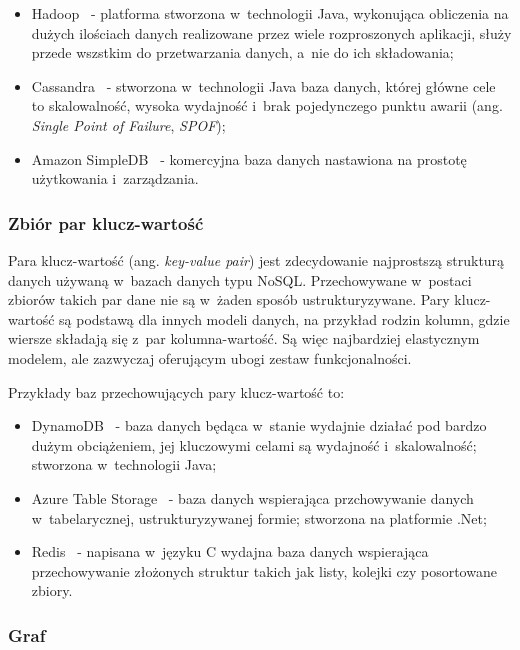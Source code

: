 \begin{itemize}
 \item Hadoop~\cite{hadoop} - platforma stworzona w~technologii Java, wykonująca obliczenia na dużych ilościach danych realizowane przez wiele rozproszonych aplikacji, służy przede wszstkim do przetwarzania danych, a~nie do ich składowania;
 \item Cassandra~\cite{cassandra} - stworzona w~technologii Java baza danych, której główne cele to skalowalność, wysoka wydajność i~brak pojedynczego punktu awarii (ang. \emph{Single Point of Failure}, \emph{SPOF});
 \item Amazon SimpleDB~\cite{simple_db} - komercyjna baza danych nastawiona na prostotę użytkowania i~zarządzania.
\end{itemize}

\subsubsection{Zbiór par klucz-wartość}

Para klucz-wartość (ang. \emph{key-value pair}) jest zdecydowanie najprostszą strukturą danych używaną w~bazach danych typu NoSQL.
Przechowywane w~postaci zbiorów takich par dane nie są w~żaden sposób ustrukturyzywane.
Pary klucz-wartość są podstawą dla innych modeli danych, na przykład rodzin kolumn, gdzie wiersze składają się z~par kolumna-wartość.
Są więc najbardziej elastycznym modelem, ale zazwyczaj oferującym ubogi zestaw funkcjonalności.

Przykłady baz przechowujących pary klucz-wartość to:

\begin{itemize}
 \item DynamoDB~\cite{dynamo_db} - baza danych będąca w~stanie wydajnie działać pod bardzo dużym obciążeniem, jej kluczowymi celami są wydajność i~skalowalność; stworzona w~technologii Java;
 \item Azure Table Storage~\cite{azure_table_storage} - baza danych wspierająca przchowywanie danych w~tabelarycznej, ustrukturyzywanej formie; stworzona na platformie .Net;
 \item Redis~\cite{redis} - napisana w~języku C wydajna baza danych wspierająca przechowywanie złożonych struktur takich jak listy, kolejki czy posortowane zbiory.
\end{itemize}

\subsubsection{Graf}

